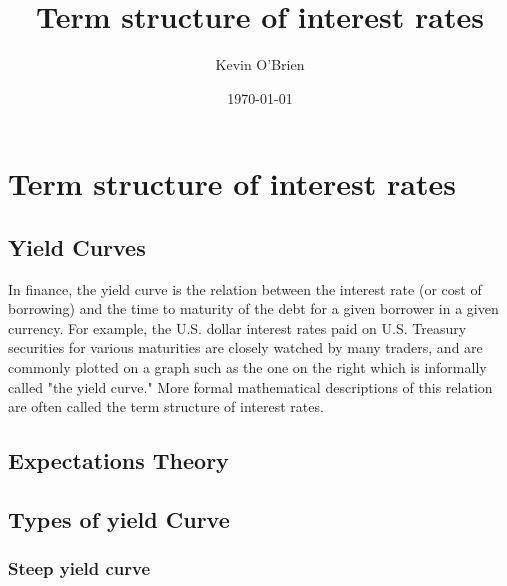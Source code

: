 \documentclass[12pt, a4paper]{report}
\begin{document}
\author{Kevin O'Brien}
\title{Term structure of interest rates}
\date{\today}
\maketitle

\tableofcontents \setcounter{tocdepth}{2}


\chapter{Term structure of interest rates}


\section{Yield Curves}
In finance, the yield curve is the relation between the interest
rate (or cost of borrowing) and the time to maturity of the debt
for a given borrower in a given currency. For example, the U.S.
dollar interest rates paid on U.S. Treasury securities for various
maturities are closely watched by many traders, and are commonly
plotted on a graph such as the one on the right which is
informally called "the yield curve." More formal mathematical
descriptions of this relation are often called the term structure
of interest rates.


\section{Expectations Theory}


\section{Types of yield Curve}
\subsection{Steep yield curve }
\end{document}
